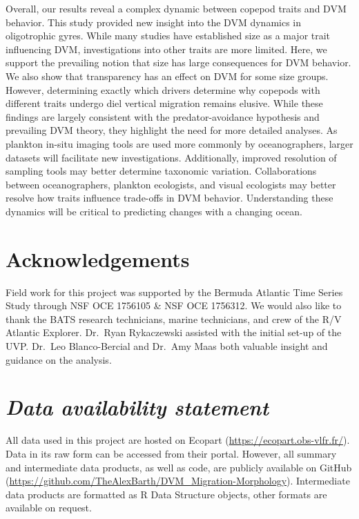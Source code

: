 \documentclass[
]{article}
\begin{document}
Overall, our results reveal a complex dynamic between copepod traits and
DVM behavior. This study provided new insight into the DVM dynamics in
oligotrophic gyres. While many studies have established size as a major
trait influencing DVM, investigations into other traits are more
limited. Here, we support the prevailing notion that size has large
consequences for DVM behavior. We also show that transparency has an
effect on DVM for some size groups. However, determining exactly which
drivers determine why copepods with different traits undergo diel
vertical migration remains elusive. While these findings are largely
consistent with the predator-avoidance hypothesis and prevailing DVM
theory, they highlight the need for more detailed analyses. As plankton
in-situ imaging tools are used more commonly by oceanographers, larger
datasets will facilitate new investigations. Additionally, improved
resolution of sampling tools may better determine taxonomic variation.
Collaborations between oceanographers, plankton ecologists, and visual
ecologists may better resolve how traits influence trade-offs in DVM
behavior. Understanding these dynamics will be critical to predicting
changes with a changing ocean.

\hypertarget{acknowledgements}{%
\section{Acknowledgements}\label{acknowledgements}}

Field work for this project was supported by the Bermuda Atlantic Time
Series Study through NSF OCE 1756105 \& NSF OCE 1756312. We would also
like to thank the BATS research technicians, marine technicians, and
crew of the R/V Atlantic Explorer. Dr.~Ryan Rykaczewski assisted with
the initial set-up of the UVP. Dr.~Leo Blanco-Bercial and Dr.~Amy Maas
both valuable insight and guidance on the analysis.

\hypertarget{data-availability-statement}{%
\section{\texorpdfstring{\emph{Data availability
statement}}{Data availability statement}}\label{data-availability-statement}}

All data used in this project are hosted on Ecopart
(\url{https://ecopart.obs-vlfr.fr/}). Data in its raw form can be
accessed from their portal. However, all summary and intermediate data
products, as well as code, are publicly available on GitHub
(\url{https://github.com/TheAlexBarth/DVM_Migration-Morphology}).
Intermediate data products are formatted as R Data Structure objects,
other formats are available on request.
\end{document}

